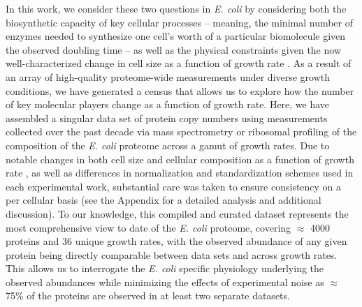In this work, we consider these two questions in \textit{E. coli} by considering
both the biosynthetic capacity of key cellular processes --  meaning, the minimal
number of enzymes needed to synthesize one cell's worth of a particular biomolecule
given the observed doubling time --  as well as the physical constraints given the now
well-characterized change in cell size as a function of growth rate
\citep{taheriaraghi2015, si2017, basan2015}. As a result of an array of
high-quality proteome-wide measurements under diverse growth conditions, we have
generated a census that allows us to explore how the number of key molecular
players change as a function of growth rate. Here, we have assembled a singular
data set of protein copy numbers using measurements collected over the past
decade via mass spectrometry \citep{schmidt2016, peebo2015, valgepea2013} or
ribosomal profiling \citep{li2014} of the composition of the \textit{E. coli}
proteome across a gamut of growth rates. Due to notable changes in both cell
size and cellular composition as a function of growth rate \citep{bremer2008,
taheriaraghi2015}, as well as differences in normalization and standardization
schemes used in each experimental work, substantial care was taken to ensure
consistency on a per cellular basis (see the Appendix for a detailed analysis
and additional discussion). To our knowledge, this compiled and curated dataset
represents the most comprehensive view to date of the \textit{E. coli} proteome,
covering $\approx$ 4000 proteins and 36 unique growth rates, with the observed
abundance of any given protein being directly comparable between data sets and
across growth rates. This allows us to interrogate the \textit{E. coli} specific
physiology underlying the observed abundances while minimizing the effects of
experimental noise as $\approx$ 75\% of the  proteins are observed in at least
two separate datasets.


